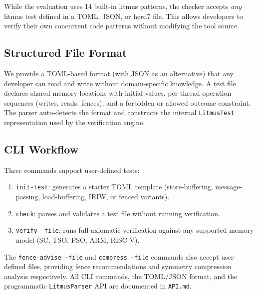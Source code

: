 \documentclass[11pt]{article}
\begin{document}
While the evaluation uses 14 built-in litmus patterns, the checker accepts \emph{any} litmus test defined in a TOML, JSON, or herd7 file. This allows developers to verify their own concurrent code patterns without modifying the tool source.

\subsection{Structured File Format}

We provide a TOML-based format (with JSON as an alternative) that any developer can read and write without domain-specific knowledge. A test file declares shared memory locations with initial values, per-thread operation sequences (writes, reads, fences), and a forbidden or allowed outcome constraint. The parser auto-detects the format and constructs the internal \texttt{LitmusTest} representation used by the verification engine.

\subsection{CLI Workflow}

Three commands support user-defined tests:
\begin{enumerate}
    \item \texttt{init-test}: generates a starter TOML template (store-buffering, message-passing, load-buffering, IRIW, or fenced variants).
    \item \texttt{check}: parses and validates a test file without running verification.
    \item \texttt{verify --file}: runs full axiomatic verification against any supported memory model (SC, TSO, PSO, ARM, RISC-V).
\end{enumerate}
The \texttt{fence-advise --file} and \texttt{compress --file} commands also accept user-defined files, providing fence recommendations and symmetry compression analysis respectively. All CLI commands, the TOML/JSON format, and the programmatic \texttt{LitmusParser} API are documented in \texttt{API.md}.
\end{document}
